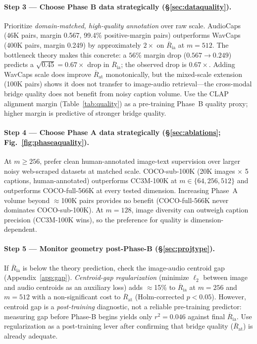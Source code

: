 \documentclass{article}
\newcommand{\avgR}{\overline{R}}
\begin{document}
\paragraph{Step 3 --- Choose Phase B data strategically (§\ref{sec:dataquality}).}
Prioritize \emph{domain-matched, high-quality annotation} over raw scale.
AudioCaps (46K pairs, margin 0.567, 99.4\% positive-margin pairs) outperforms WavCaps
(400K pairs, margin 0.249) by approximately $2\times$ on $\avgR_\mathrm{ia}$ at $m=512$.
The bottleneck theory makes this concrete: a $56\%$ margin drop ($0.567 \to 0.249$) predicts
a $\sqrt{0.45} = 0.67\times$ drop in $\avgR_\mathrm{ia}$; the observed drop is $0.67\times$.
Adding WavCaps scale does improve $\avgR_\mathrm{at}$ monotonically, but the mixed-scale extension (100K pairs)
shows it does not transfer to image-audio retrieval---the cross-modal bridge quality does not
benefit from noisy caption volume.
Use the CLAP alignment margin (Table~\ref{tab:quality}) as a pre-training Phase~B quality proxy;
higher margin is predictive of stronger bridge quality.

\paragraph{Step 4 --- Choose Phase A data strategically (§\ref{sec:ablations};
Fig.~\ref{fig:phaseaquality}).}
At $m \geq 256$, prefer clean human-annotated image-text supervision over larger noisy
web-scraped datasets at matched scale.
COCO-sub-100K (20K images $\times$ 5 captions, human-annotated) outperforms CC3M-100K
at $m \in \{64, 256, 512\}$ and outperforms COCO-full-566K at every tested dimension.
Increasing Phase~A volume beyond $\approx$100K pairs provides no benefit (COCO-full-566K
never dominates COCO-sub-100K).
At $m=128$, image diversity can outweigh caption precision (CC3M-100K wins), so the
preference for quality is dimension-dependent.

\paragraph{Step 5 --- Monitor geometry post-Phase-B (§\ref{sec:projtype}).}
If $\avgR_\mathrm{ia}$ is below the theory prediction, check the image-audio centroid gap
(Appendix~\ref{app:gap}).
\emph{Centroid-gap regularization} (minimize $\ell_2$ between image and audio
centroids as an auxiliary loss) adds $\approx$15\% to $\avgR_\mathrm{ia}$ at $m=256$ and
$m=512$ with a non-significant cost to $\avgR_\mathrm{at}$ (Holm-corrected $p < 0.05$).
However, centroid gap is a \emph{post-training} diagnostic, not a reliable pre-training predictor:
measuring gap before Phase-B begins yields only $r^2=0.046$ against final $\avgR_\mathrm{ia}$.
Use regularization as a post-training lever after confirming that bridge quality ($\avgR_\mathrm{at}$)
is already adequate.
\end{document}
